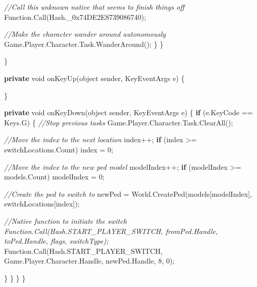 \documentclass[
  openany]{book}
\newenvironment{Shaded}{\begin{snugshade}}{\end{snugshade}}
\newcommand{\BaseNTok}[1]{\textcolor[rgb]{0.00,0.00,0.81}{#1}}
\newcommand{\CommentTok}[1]{\textcolor[rgb]{0.56,0.35,0.01}{\textit{#1}}}
\newcommand{\DataTypeTok}[1]{\textcolor[rgb]{0.13,0.29,0.53}{#1}}
\newcommand{\DecValTok}[1]{\textcolor[rgb]{0.00,0.00,0.81}{#1}}
\newcommand{\FunctionTok}[1]{\textcolor[rgb]{0.00,0.00,0.00}{#1}}
\newcommand{\KeywordTok}[1]{\textcolor[rgb]{0.13,0.29,0.53}{\textbf{#1}}}
\newcommand{\NormalTok}[1]{#1}
\begin{document}
\begin{Shaded}
\begin{Highlighting}[]
                    \CommentTok{//Call this unknown native that seems to finish things off}
\NormalTok{                    Function.}\FunctionTok{Call}\NormalTok{(Hash._}\BaseNTok{0x74DE2E8739086740}\NormalTok{);}

            \CommentTok{//Make the character wander around autonomously}
\NormalTok{                    Game.}\FunctionTok{Player}\NormalTok{.}\FunctionTok{Character}\NormalTok{.}\FunctionTok{Task}\NormalTok{.}\FunctionTok{WanderAround}\NormalTok{();}
\NormalTok{                \}}
\NormalTok{            \}}

\NormalTok{        \}}


        \KeywordTok{private} \DataTypeTok{void} \FunctionTok{onKeyUp}\NormalTok{(}\DataTypeTok{object}\NormalTok{ sender, KeyEventArgs e)}
\NormalTok{        \{}

\NormalTok{        \}}

        \KeywordTok{private} \DataTypeTok{void} \FunctionTok{onKeyDown}\NormalTok{(}\DataTypeTok{object}\NormalTok{ sender, KeyEventArgs e)}
\NormalTok{        \{}
            \KeywordTok{if}\NormalTok{ (e.}\FunctionTok{KeyCode}\NormalTok{ == Keys.}\FunctionTok{G}\NormalTok{)}
\NormalTok{            \{}
        \CommentTok{//Stop previous tasks}
\NormalTok{                Game.}\FunctionTok{Player}\NormalTok{.}\FunctionTok{Character}\NormalTok{.}\FunctionTok{Task}\NormalTok{.}\FunctionTok{ClearAll}\NormalTok{();}

                \CommentTok{//Move the index to the next location}
\NormalTok{                index++;}
                \KeywordTok{if}\NormalTok{ (index >= switchLocations.}\FunctionTok{Count}\NormalTok{) index = }\DecValTok{0}\NormalTok{;}
                
        \CommentTok{//Move the index to the new ped model}
\NormalTok{                modelIndex++;}
                \KeywordTok{if}\NormalTok{ (modelIndex >= models.}\FunctionTok{Count}\NormalTok{) modelIndex = }\DecValTok{0}\NormalTok{;}

                \CommentTok{//Create the ped to switch to}
\NormalTok{                newPed = World.}\FunctionTok{CreatePed}\NormalTok{(models[modelIndex], switchLocations[index]);}

                \CommentTok{//Native function to initiate the switch Function.Call(Hash.START_PLAYER_SWITCH, fromPed.Handle, toPed.Handle, flags, switchType);}
\NormalTok{                Function.}\FunctionTok{Call}\NormalTok{(Hash.}\FunctionTok{START_PLAYER_SWITCH}\NormalTok{, Game.}\FunctionTok{Player}\NormalTok{.}\FunctionTok{Character}\NormalTok{.}\FunctionTok{Handle}\NormalTok{, newPed.}\FunctionTok{Handle}\NormalTok{, }\DecValTok{8}\NormalTok{, }\DecValTok{0}\NormalTok{);}

\NormalTok{            \}}
\NormalTok{        \}}
\NormalTok{    \}}
\NormalTok{\}}
\end{Highlighting}
\end{Shaded}
\end{document}
